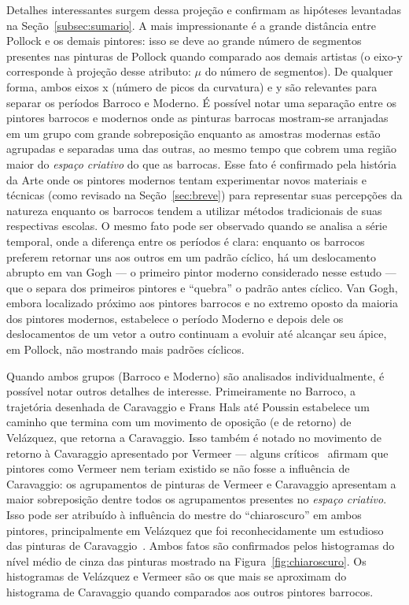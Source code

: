 Detalhes interessantes surgem dessa projeção e confirmam as hipóteses
levantadas na Seção~\ref{subsec:sumario}. A mais impressionante é a
grande distância entre Pollock e os demais pintores: isso se deve ao
grande número de segmentos presentes nas pinturas de Pollock quando
comparado aos demais artistas (o eixo-y corresponde à projeção desse
atributo: $\mu$ do número de segmentos). De qualquer forma, ambos
eixos x (número de picos da curvatura) e y são relevantes para separar
os períodos Barroco e Moderno. É possível notar uma separação entre os
pintores barrocos e modernos onde as pinturas barrocas mostram-se
arranjadas em um grupo com grande sobreposição enquanto as amostras
modernas estão agrupadas e separadas uma das outras, ao mesmo tempo
que cobrem uma região maior do \textit{espaço criativo} do que as
barrocas. Esse fato é confirmado pela história da Arte onde os
pintores modernos tentam experimentar novos materiais e técnicas (como
revisado na Seção~\ref{sec:breve}) para representar suas percepções da
natureza enquanto os barrocos tendem a utilizar métodos tradicionais
de suas respectivas escolas. O mesmo fato pode ser observado quando se
analisa a série temporal, onde a diferença entre os períodos é clara:
enquanto os barrocos preferem retornar uns aos outros em um padrão
cíclico, há um deslocamento abrupto em van Gogh --- o primeiro pintor
moderno considerado nesse estudo --- que o separa dos primeiros
pintores e ``quebra'' o padrão antes cíclico. Van Gogh, embora
localizado próximo aos pintores barrocos e no extremo oposto da
maioria dos pintores modernos, estabelece o período Moderno e depois
dele os deslocamentos de um vetor a outro continuam a evoluir até
alcançar seu ápice, em Pollock, não mostrando mais padrões cíclicos.

Quando ambos grupos (Barroco e Moderno) são analisados
individualmente, é possível notar outros detalhes de
interesse. Primeiramente no Barroco, a trajetória desenhada de
Caravaggio e Frans Hals até Poussin estabelece um caminho que termina
com um movimento de oposição (e de retorno) de Vel\'{a}zquez, que
retorna a Caravaggio.  Isso também é notado no movimento de retorno à
Cavaraggio apresentado por Vermeer --- alguns críticos~\cite{lambert}
afirmam que pintores como Vermeer nem teriam existido se não fosse a
influência de Caravaggio: os agrupamentos de pinturas de Vermeer e
Caravaggio apresentam a maior sobreposição dentre todos os
agrupamentos presentes no \textit{espaço criativo}. Isso pode ser
atribuído à influência do mestre do ``chiaroscuro'' em ambos pintores,
principalmente em Vel\'{a}zquez que foi reconhecidamente um estudioso
das pinturas de Caravaggio~\cite{gombrich}. Ambos fatos são
confirmados pelos histogramas do nível médio de cinza das pinturas
mostrado na Figura~\ref{fig:chiaroscuro}. Os histogramas de Velázquez
e Vermeer são os que mais se aproximam do histograma de Caravaggio
quando comparados aos outros pintores barrocos.

